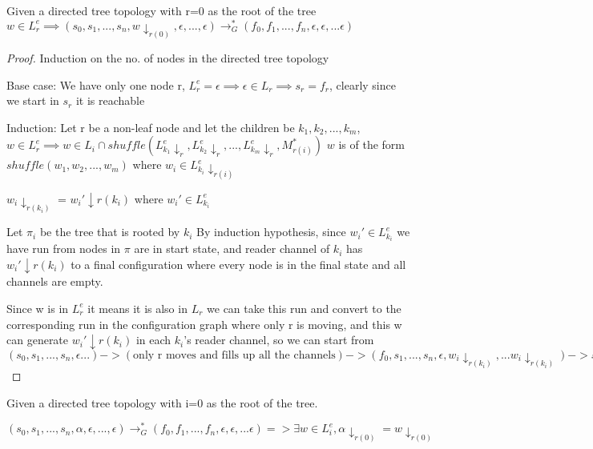 \documentclass[a4paper,UKenglish,cleveref, autoref, thm-restate]{lipics-v2019}
\begin{document}
    

\begin{lemma}\label{testenv-lemma}
Given a directed tree topology with r=0 as the root of the tree
$w \in L_r^e \implies (s_0, s_1, ...,s_n, w \downarrow_{r(0)}, \epsilon, ...,\epsilon) \rightarrow_G^* (f_0, f_1, ..., f_n, \epsilon, \epsilon, ... \epsilon)$
\end{lemma}
   
   
\begin{proof}
Induction on the no. of nodes in the directed tree topology

Base case: We have only one node r,  $L_r^e = {\epsilon} \implies \epsilon \in L_r \implies s_r = f_r$, clearly since we start in $s_r$ it is reachable

Induction: 
Let r be a non-leaf node and let the children be $k_1, k_2, ..., k_m$,  
$w \in L_r^e \implies w \in L_i \cap shuffle(L_{k_1}^e\!\!\!\downarrow_{r}, L_{k_2}^e\!\!\!\downarrow_{r}, ..., L_{k_m}^e\!\!\!\downarrow_{r}, M_{r(i)}^*)$
$w$ is of the form $shuffle(w_1, w_2, ..., w_m)$ where $w_i \in L_{k_i}^e\!\!\!\downarrow_{r(i)}$

$w_i\downarrow_{r(k_i)}$ = $w_i'\downarrow{r(k_i)}$ where $w_i' \in L_{k_i}^e$

Let $\pi_i$ be the tree that is rooted by $k_i$
By induction hypothesis, since $w_i' \in L_{k_i}^e$ we have run from nodes in $\pi$ are in start state, and reader channel of $k_i$ has $w_i'\downarrow{r(k_i)}$ 
to a final configuration where every node is in the final state and all channels are empty.

Since w is in $L_r^e$ it means it is also in $L_r$ we can take this run and convert to the corresponding run in the configuration graph where only r is moving, 
and this w can generate $w_i'\downarrow{r(k_i)}$ in each $k_i$'s reader channel, so we can start from $(s_0, s_1,...,s_n, \epsilon ...) -> (\text{only r moves and fills up all the channels}) -> (f_0, s_1, ..., s_n,\epsilon, w_i\downarrow_{r(k_i)}, ... w_i\downarrow_{r(k_i)} ) -> stitch the k_i run one after the other$ 

    
   \end{proof}
    
   

   
\begin{lemma}\label{testenv-lemma}
Given a directed tree topology with i=0 as the root of the tree.

$(s_0, s_1, ...,s_n, \alpha, \epsilon, ...,\epsilon) \rightarrow_G^* (f_0, f_1, ..., f_n, \epsilon, \epsilon, ... \epsilon) => \exists w \in L_i^e,   \alpha \downarrow_{r(0)} = w \downarrow_{r(0)}$

   \end{lemma}
   
\end{document}
